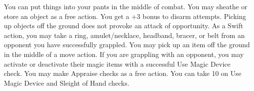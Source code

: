\combatfeat
{You can put things into your pants in the middle of combat.}
{You may sheathe or store an object as a free action.}
{You get a +3 bonus to disarm attempts. Picking up objects off the ground does not provoke an attack of opportunity.}
{As a Swift action, you may take a ring, amulet/necklace, headband, bracer, or belt from an opponent you have successfully grappled. You may pick up an item off the ground in the middle of a move action.}
{If you are grappling with an opponent, you may activate or deactivate their magic items with a successful Use Magic Device check. You may make Appraise checks as a free action.}
{You can take 10 on Use Magic Device and Sleight of Hand checks.}